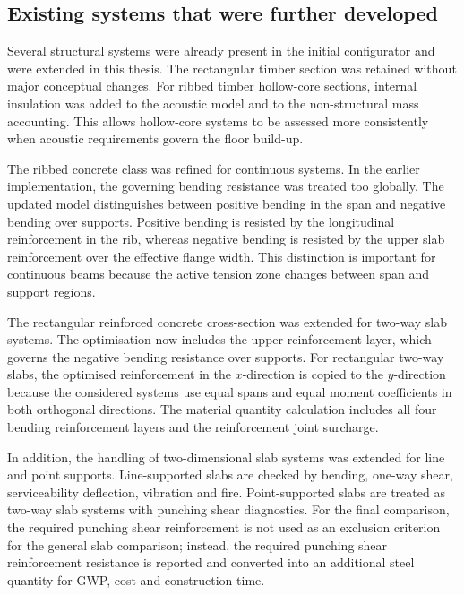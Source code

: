 \subsection{Existing systems that were further developed}

Several structural systems were already present in the initial configurator and were extended in this thesis. The rectangular timber section was retained without major conceptual changes. For ribbed timber hollow-core sections, internal insulation was added to the acoustic model and to the non-structural mass accounting. This allows hollow-core systems to be assessed more consistently when acoustic requirements govern the floor build-up.

\noindent The ribbed concrete class was refined for continuous systems. In the earlier implementation, the governing bending resistance was treated too globally. The updated model distinguishes between positive bending in the span and negative bending over supports. Positive bending is resisted by the longitudinal reinforcement in the rib, whereas negative bending is resisted by the upper slab reinforcement over the effective flange width. This distinction is important for continuous beams because the active tension zone changes between span and support regions.

\noindent The rectangular reinforced concrete cross-section was extended for two-way slab systems. The optimisation now includes the upper reinforcement layer, which governs the negative bending resistance over supports. For rectangular two-way slabs, the optimised reinforcement in the $x$-direction is copied to the $y$-direction because the considered systems use equal spans and equal moment coefficients in both orthogonal directions. The material quantity calculation includes all four bending reinforcement layers and the reinforcement joint surcharge.

\noindent In addition, the handling of two-dimensional slab systems was extended for line and point supports. Line-supported slabs are checked by bending, one-way shear, serviceability deflection, vibration and fire. Point-supported slabs are treated as two-way slab systems with punching shear diagnostics. For the final comparison, the required punching shear reinforcement is not used as an exclusion criterion for the general slab comparison; instead, the required punching shear reinforcement resistance is reported and converted into an additional steel quantity for GWP, cost and construction time.

